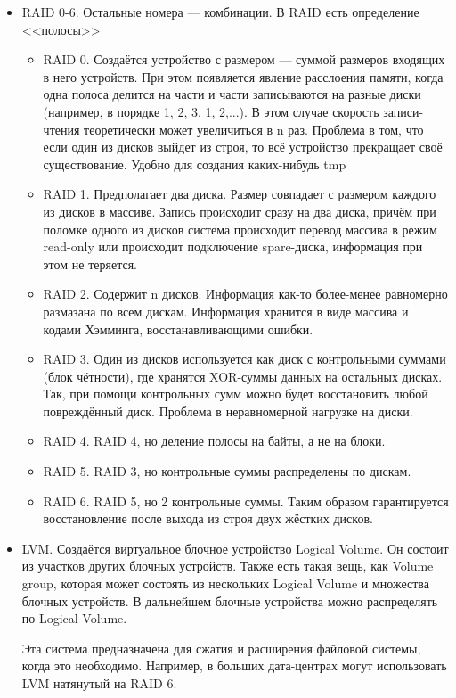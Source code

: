 \begin{itemize}
\item RAID 0-6. Остальные номера --- комбинации. В RAID есть определение <<полосы>>
\begin{itemize}
\item RAID 0. Создаётся устройство с размером --- суммой размеров входящих в него устройств. При этом появляется явление расслоения памяти, когда одна полоса делится на части и части записываются на разные диски (например, в порядке 1, 2, 3, 1, 2,...). В этом случае скорость записи-чтения теоретически может увеличиться в n раз. Проблема в том, что если один из дисков выйдет из строя, то всё устройство прекращает своё существование. Удобно для создания каких-нибудь tmp

\item RAID 1. Предполагает два диска. Размер совпадает с размером каждого из дисков в массиве. Запись происходит сразу на два диска, причём при поломке одного из дисков система происходит перевод массива в режим read-only или происходит подключение spare-диска, информация при этом не теряется.

\item RAID 2. Содержит n дисков. Информация как-то более-менее равномерно размазана по всем дискам. Информация хранится в виде массива и кодами Хэмминга, восстанавливающими ошибки. 

\item RAID 3. Один из дисков используется как диск с контрольными суммами (блок чётности), где хранятся XOR-суммы данных на остальных дисках. Так, при помощи контрольных сумм можно будет восстановить любой повреждённый диск. Проблема в неравномерной нагрузке на диски.

\item RAID 4. RAID 4, но деление полосы на байты, а не на блоки.

\item RAID 5. RAID 3, но контрольные суммы распределены по дискам.

\item RAID 6. RAID 5, но 2 контрольные суммы. Таким образом гарантируется восстановление после выхода из строя двух жёстких дисков.
\end{itemize}

\item LVM. Создаётся виртуальное блочное устройство Logical Volume. Он состоит из участков других блочных устройств. Также есть такая вещь, как Volume group, которая может состоять из нескольких Logical Volume и множества блочных устройств. В дальнейшем блочные устройства можно распределять по Logical Volume.

Эта система предназначена для сжатия и расширения файловой системы, когда это необходимо. Например, в больших дата-центрах могут использовать LVM натянутый на RAID 6.
\end{itemize}

